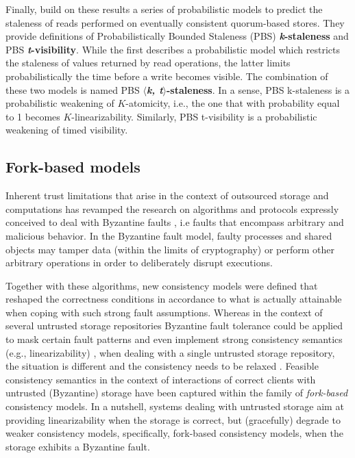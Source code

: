 \documentclass[letter, 11pt]{article}
\newcommand{\citeN}{\citet}
\renewcommand{\cite}{\citep}
\begin{document}
Finally, \citeN{Bailis.Venkataraman.ea:12} build on these results a series of
probabilistic models to predict the staleness of reads performed on eventually consistent quorum-based stores. They provide definitions of Probabilistically Bounded Staleness (PBS) \textbf{\emph{k}-staleness} and PBS \textbf{\emph{t}-visibility}. 
While the first describes a probabilistic model which restricts the staleness of values returned by read operations, the latter limits probabilistically the time before a write becomes visible. The combination of these two models is named PBS \textbf{$\langle$\emph{k, t}$\rangle$-staleness}.
In a sense, PBS k-staleness is a probabilistic weakening of $K$-atomicity, i.e., the one that with probability equal to 1 becomes $K$-linearizability. Similarly, PBS t-visibility is a probabilistic weakening of timed visibility.





\subsection{Fork-based models}
\label{subsec:fork}



Inherent trust limitations that arise in the context of outsourced storage and computations \cite{Cachin.Keidar.ea:09,Vukolic:10} has revamped the  research on algorithms and protocols expressly  conceived to deal with Byzantine faults \cite{Lamport.ea:82}, 
i.e faults that encompass arbitrary and malicious behavior. In the Byzantine fault model, 
faulty processes and shared objects may tamper data (within the limits of cryptography) or perform other arbitrary 
operations in order to deliberately disrupt executions.

Together with these algorithms, new consistency models were defined that reshaped the 
correctness conditions in accordance to what is actually attainable when coping 
with such strong fault assumptions. Whereas in the context of several untrusted storage repositories Byzantine fault tolerance could be applied to mask certain fault patterns \cite{Vukolic:10,Bessani.Correia.ea:13} and even implement strong consistency semantics (e.g., linearizability) \cite{Bessani.Mendes.ea:14,Dobre.ea:14}, when dealing with a single untrusted storage repository, the situation is different and the consistency needs to be relaxed \cite{Cachin.Keidar.ea:09}. Feasible consistency semantics in the context of interactions of correct clients with untrusted (Byzantine) storage have been captured within the family of \emph{fork-based} consistency models. In a nutshell, systems dealing with untrusted storage aim at providing linearizability when the storage is correct, but (gracefully) degrade to weaker consistency models, specifically, fork-based consistency models, when the storage exhibits a Byzantine fault.
\end{document}
